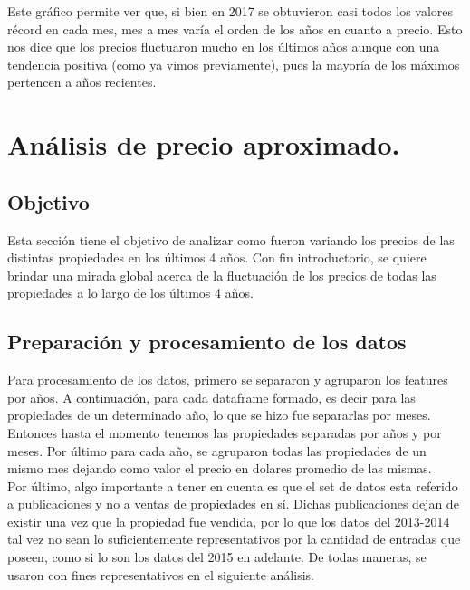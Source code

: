 \documentclass[a4paper, 10pt]{article}
\newcommand\tab[1][0.5cm]{\hspace*{#1}}
\begin{document}
				\tab Este gráfico permite ver que, si bien en 2017 se obtuvieron casi todos los valores récord en cada mes, mes a mes
				varía el orden de los años en cuanto a precio. Esto nos dice que los precios fluctuaron mucho en los últimos años
				aunque con una tendencia positiva (como ya vimos previamente), pues la mayoría de los máximos pertencen a años
				recientes.
		\section{Análisis de precio aproximado.}
	      	\subsection{Objetivo}
    				Esta sección tiene el objetivo de analizar como fueron variando los precios de las distintas propiedades en los
    				últimos 4 años. Con fin introductorio, se quiere brindar una mirada global acerca de la fluctuación de los precios
    				de todas las propiedades a lo largo de los últimos 4 años.
	      \subsection{Preparación y procesamiento de los datos}
			Para procesamiento de los datos, primero se separaron y agruparon los features por años. A continuación, para cada
			dataframe formado, es decir para las propiedades de un determinado año, lo que se hizo fue separarlas por meses. Entonces
			hasta el momento tenemos las propiedades separadas por años y por meses. Por último para cada año, se agruparon todas las
			propiedades de un mismo mes dejando como valor el precio en dolares promedio de las mismas. \\
       		\tab Por último, algo importante a tener en cuenta es que el set de datos esta referido a publicaciones y no a ventas de
       		propiedades en sí. Dichas publicaciones dejan de existir una vez que la propiedad fue vendida, por lo que los datos del
       		2013-2014 tal vez no sean lo suficientemente representativos por la cantidad de entradas que poseen, como si lo son los
       		datos del 2015 en adelante. De todas maneras, se usaron con fines representativos en el siguiente análisis. 
\end{document}
